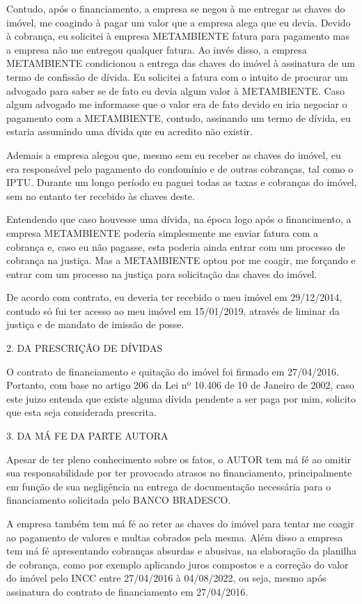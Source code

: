 \documentclass[11pt]{letter}
\begin{document}
Contudo, após o financiamento, a empresa se negou à me entregar as chaves do imóvel, me coagindo à pagar um valor que a empresa alega que eu devia. Devido à cobrança, eu solicitei à empresa METAMBIENTE fatura para pagamento mas a empresa não me entregou qualquer fatura. Ao invés disso, a empresa METAMBIENTE condicionou a entrega das chaves do imóvel à assinatura de um termo de confissão de dívida. Eu solicitei a fatura com o intuito de procurar um advogado para saber se de fato eu devia algum valor à METAMBIENTE. Caso algum advogado me informasse que o valor era de fato devido eu iria negociar o pagamento com a METAMBIENTE, contudo, assinando um termo de dívida, eu estaria assumindo uma dívida que eu acredito não existir. 

Ademais a empresa alegou que, mesmo sem eu receber as chaves do imóvel, eu era responsável pelo pagamento do condomínio e de outras cobranças, tal como o IPTU. Durante um longo período eu paguei todas as taxas e cobranças do imóvel, sem no entanto ter recebido às chaves deste.

Entendendo que caso houvesse uma dívida, na época logo após o financimento, a empresa METAMBIENTE poderia simplesmente me enviar fatura com a cobrança e, caso eu não pagasse, esta poderia ainda entrar com um processo de cobrança na justiça. Mas a METAMBIENTE optou por me coagir, me forçando e entrar com um processo na justiça para solicitação das chaves do imóvel.

De acordo com contrato, eu deveria ter recebido o meu imóvel em 29/12/2014, contudo só fui ter acesso ao meu imóvel em 15/01/2019, através de liminar da justiça e de mandato de imissão de posse. 

2. DA PRESCRIÇÃO DE DÍVIDAS

O contrato de financiamento e quitação do imóvel foi firmado em 27/04/2016. Portanto, com base no artigo 206 da Lei nº 10.406 de 10 de Janeiro de 2002, caso este juizo entenda que existe alguma dívida pendente a ser paga por mim, solicito que esta seja considerada prescrita.

3. DA MÁ FE DA PARTE AUTORA

Apesar de ter pleno conhecimento sobre os fatos, o AUTOR tem má fé ao omitir sua responsabilidade por ter provocado atrasos no financiamento, principalmente em função de sua negligência na entrega de documentação necessária para o financiamento solicitada pelo BANCO BRADESCO.

A empresa também tem má fé ao reter as chaves do imóvel para tentar me coagir ao pagamento de valores e multas cobrados pela mesma. Além disso a empresa tem má fé apresentando cobranças absurdas e abusivas, na elaboração da planilha de cobrança, como por exemplo aplicando juros compostos e a correção do valor do imóvel pelo INCC entre 27/04/2016 à 04/08/2022, ou seja, mesmo após assinatura do contrato de financiamento em 27/04/2016.
\end{document}
